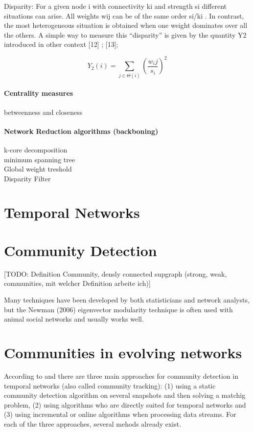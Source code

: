 Disparity: For a given node i   with connectivity  ki  and strength  si  different situations can arise. All weights  wij  can be of the same order  si/ki . In contrast, the most heterogeneous situation is obtained when one weight dominates over all the others. A simple way to measure this “disparity” is given by the quantity  Y2  introduced in other context [12] ;  [13];

$$Y_2(i)=\sum_{j\in \Theta(i)} (\frac{w_ij}{s_i})^2$$

\paragraph*{Centrality measures}
betweenness and closeness

\paragraph{Network Reduction algorithms (backboning)}
k-core decomposition\\
minimum spanning tree\\
Global weight treshold\\
Disparity Filter\\


\section{Temporal Networks}

\section{Community Detection}

[TODO: Definition Community, densly connected supgraph (strong, weak, communities, mit welcher Definition arbeite ich)]

Many techniques have been developed by both statisticians and network analysts, but the Newman (2006) eigenvector modularity technique is often used with animal social networks and usually works well.~\cite{farine2015constructing}

\section{Communities in evolving networks}
\label{sec:bg:tracking}
According to \textcite{aynaud2013communities} and \textcite{brodka2014community} there are three main approaches for community detection in temporal networks (also called community tracking): (1) using a static community detection algorithm on several snapshots and then solving a matchig problem, (2) using algorithms who are directly suited for temporal networks and (3) using incremental or online algorithms when processing data streams. For each of the three approaches, several mehods already exist.

